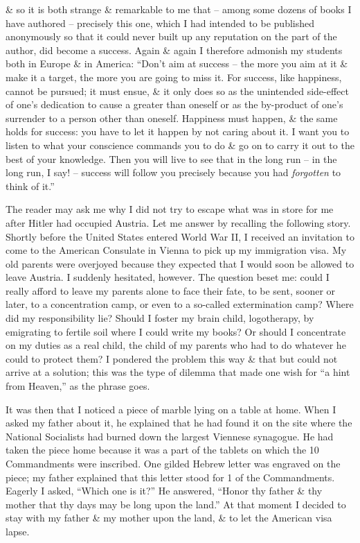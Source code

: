 \documentclass{article}
\numberwithin{equation}{section}
\begin{document}
\& so it is both strange \& remarkable to me that -- among some dozens of books I have authored -- precisely this one, which I had intended to be published anonymously so that it could never built up any reputation on the part of the author, did become a success. Again \& again I therefore admonish my students both in Europe \& in America: ``Don't aim at success -- the more you aim at it \& make it a target, the more you are going to miss it. For success, like happiness, cannot be pursued; it must ensue, \& it only does so as the unintended side-effect of one's dedication to cause a greater than oneself or as the by-product of one's surrender to a person other than oneself. Happiness must happen, \& the same holds for success: you have to let it happen by not caring about it. I want you to listen to what your conscience commands you to do \& go on to carry it out to the best of your knowledge. Then you will live to see that in the long run -- in the long run, I say! -- success will follow you precisely because you had \textit{forgotten} to think of it.''

The reader may ask me why I did not try to escape what was in store for me after Hitler had occupied Austria. Let me answer by recalling the following story. Shortly before the United States entered World War II, I received an invitation to come to the American Consulate in Vienna to pick up my immigration visa. My old parents were overjoyed because they expected that I would soon be allowed to leave Austria. I suddenly hesitated, however. The question beset me: could I really afford to leave my parents alone to face their fate, to be sent, sooner or later, to a concentration camp, or even to a so-called extermination camp? Where did my responsibility lie? Should I foster my brain child, logotherapy, by emigrating to fertile soil where I could write my books? Or should I concentrate on my duties as a real child, the child of my parents who had to do whatever he could to protect them? I pondered the problem this way \& that but could not arrive at a solution; this was the type of dilemma that made one wish for ``a hint from Heaven,'' as the phrase goes.

It was then that I noticed a piece of marble lying on a table at home. When I asked my father about it, he explained that he had found it on the site where the National Socialists had burned down the largest Viennese synagogue. He had taken the piece home because it was a part of the tablets on which the 10 Commandments were inscribed. One gilded Hebrew letter was engraved on the piece; my father explained that this letter stood for 1 of the Commandments. Eagerly I asked, ``Which one is it?'' He answered, ``Honor thy father \& thy mother that thy days may be long upon the land.'' At that moment I decided to stay with my father \& my mother upon the land, \& to let the American visa lapse.
\end{document}
